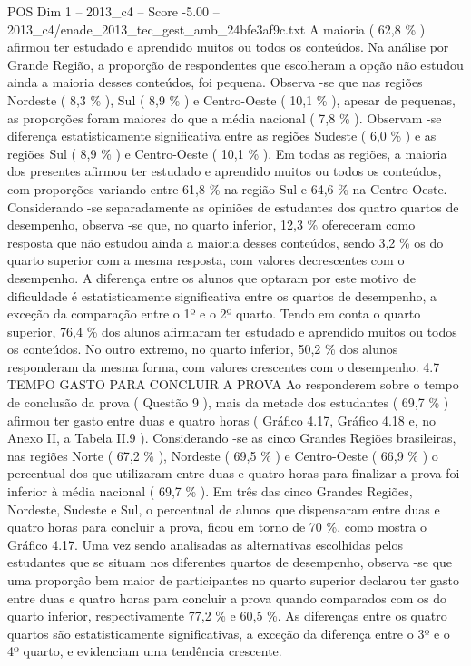 \begin{textsample}{POS Dim 1 – 2013\_c4 – Score -5.00 – 2013\_c4/enade\_2013\_tec\_gest\_amb\_24bfe3af9c.txt}
A maioria ( 62,8 \% ) afirmou ter estudado e aprendido muitos ou todos os conteúdos.
Na análise por Grande Região, a proporção de respondentes que escolheram a opção não estudou ainda a maioria desses conteúdos, foi pequena.
Observa -se que nas regiões Nordeste ( 8,3 \% ), Sul ( 8,9 \% ) e Centro-Oeste ( 10,1 \% ), apesar de pequenas, as proporções foram maiores do que a média nacional ( 7,8 \% ).
Observam -se diferença estatisticamente significativa entre as regiões Sudeste ( 6,0 \% ) e as regiões Sul ( 8,9 \% ) e Centro-Oeste ( 10,1 \% ).
Em todas as regiões, a maioria dos presentes afirmou ter estudado e aprendido muitos ou todos os conteúdos, com proporções variando entre 61,8 \% na região Sul e 64,6 \% na Centro-Oeste.
Considerando -se separadamente as opiniões de estudantes dos quatro quartos de desempenho, observa -se que, no quarto inferior, 12,3 \% ofereceram como resposta que não estudou ainda a maioria desses conteúdos, sendo 3,2 \% os do quarto superior com a mesma resposta, com valores decrescentes com o desempenho.
A diferença entre os alunos que optaram por este motivo de dificuldade é estatisticamente significativa entre os quartos de desempenho, a exceção da comparação entre o 1º e o 2º quarto.
Tendo em conta o quarto superior, 76,4 \% dos alunos afirmaram ter estudado e aprendido muitos ou todos os conteúdos.
No outro extremo, no quarto inferior, 50,2 \% dos alunos responderam da mesma forma, com valores crescentes com o desempenho. 4.7 TEMPO GASTO PARA CONCLUIR A PROVA Ao responderem sobre o tempo de conclusão da prova ( Questão 9 ), mais da metade dos estudantes ( 69,7 \% ) afirmou ter gasto entre duas e quatro horas ( Gráfico 4.17, Gráfico 4.18 e, no Anexo II, a Tabela II.9 ).
Considerando -se as cinco Grandes Regiões brasileiras, nas regiões Norte ( 67,2 \% ), Nordeste ( 69,5 \% ) e Centro-Oeste ( 66,9 \% ) o percentual dos que utilizaram entre duas e quatro horas para finalizar a prova foi inferior à média nacional ( 69,7 \% ).
Em três das cinco Grandes Regiões, Nordeste, Sudeste e Sul, o percentual de alunos que dispensaram entre duas e quatro horas para concluir a prova, ficou em torno de 70 \%, como mostra o Gráfico 4.17.
Uma vez sendo analisadas as alternativas escolhidas pelos estudantes que se situam nos diferentes quartos de desempenho, observa -se que uma proporção bem maior de participantes no quarto superior declarou ter gasto entre duas e quatro horas para concluir a prova quando comparados com os do quarto inferior, respectivamente 77,2 \% e 60,5 \%.
As diferenças entre os quatro quartos são estatisticamente significativas, a exceção da diferença entre o 3º e o 4º quarto, e evidenciam uma tendência crescente.

\end{textsample}
